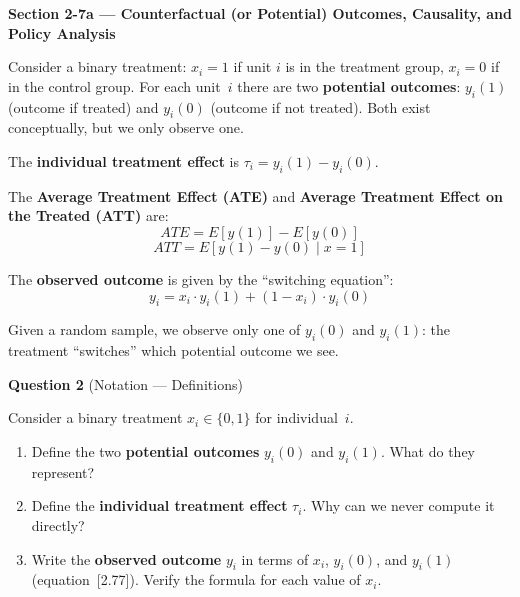 \documentclass[11pt,a4paper]{article}
\begin{document}
\begin{bookexample}
\textbf{\color{blockcolor}Section 2-7a --- Counterfactual (or Potential) Outcomes, Causality, and Policy Analysis}

\smallskip
Consider a binary treatment: $x_i = 1$ if unit $i$ is in the treatment group, $x_i = 0$ if in the control group. For each unit~$i$ there are two \textbf{potential outcomes}: $y_i(1)$ (outcome if treated) and $y_i(0)$ (outcome if not treated). Both exist conceptually, but we only observe one.

The \textbf{individual treatment effect} is $\tau_i = y_i(1) - y_i(0)$.

The \textbf{Average Treatment Effect (ATE)} and \textbf{Average Treatment Effect on the Treated (ATT)} are:
\begin{equation}
  ATE = E[y(1)] - E[y(0)] \tag{2.75}
\end{equation}
\begin{equation}
  ATT = E[y(1) - y(0) \mid x = 1] \tag{2.76}
\end{equation}

The \textbf{observed outcome} is given by the ``switching equation'':
\begin{equation}
  y_i = x_i \cdot y_i(1) + (1 - x_i) \cdot y_i(0) \tag{2.77}
\end{equation}

Given a random sample, we observe only one of $y_i(0)$ and $y_i(1)$: the treatment ``switches'' which potential outcome we see.
\end{bookexample}

\bigskip
\textbf{Question 2} (Notation --- Definitions)

\medskip
Consider a binary treatment $x_i \in \{0,1\}$ for individual~$i$.

\begin{enumerate}[label=(\alph*)]
\item Define the two \textbf{potential outcomes} $y_i(0)$ and $y_i(1)$. What do they represent?

\begin{answerbox}
\vspace{3.5cm}
\end{answerbox}

\item Define the \textbf{individual treatment effect} $\tau_i$. Why can we never compute it directly?

\begin{answerbox}
\vspace{3.5cm}
\end{answerbox}

\item Write the \textbf{observed outcome} $y_i$ in terms of $x_i$, $y_i(0)$, and $y_i(1)$ (equation~[2.77]). Verify the formula for each value of $x_i$.

\begin{answerbox}
\vspace{4cm}
\end{answerbox}
\end{enumerate}
\end{document}
